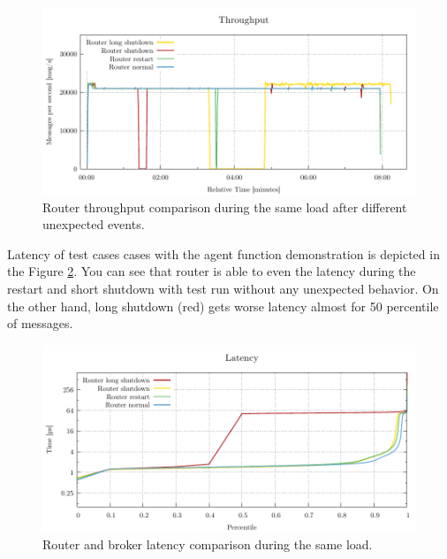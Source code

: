 \begin{figure}[H]
	\centering
	\includegraphics[width=1\linewidth]{obrazky-figures/charts-excel/agent.pdf}
	\caption{Router throughput comparison during the same load after different unexpected events.}
	\label{fig:agent_throughput}
\end{figure}

Latency of test cases cases with the agent function demonstration is depicted in the Figure \ref{fig:agent_latency}. You can see that router is able to even the latency during the restart and short shutdown with test run without any unexpected behavior. On the other hand, long shutdown (red) gets worse latency almost for 50 percentile of messages.

\begin{figure}[H]
	\centering
	\includegraphics[width=1\linewidth]{obrazky-figures/charts-excel/agent_latency.pdf}
	\caption{Router and broker latency comparison during the same load.}
	\label{fig:agent_latency}
\end{figure}
